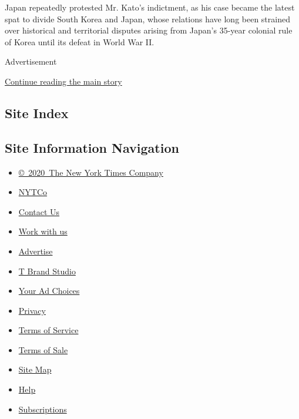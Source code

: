 Japan repeatedly protested Mr. Kato's indictment, as his case became the
latest spat to divide South Korea and Japan, whose relations have long
been strained over historical and territorial disputes arising from
Japan's 35-year colonial rule of Korea until its defeat in World War II.

Advertisement

\protect\hyperlink{after-bottom}{Continue reading the main story}

\hypertarget{site-index}{%
\subsection{Site Index}\label{site-index}}

\hypertarget{site-information-navigation}{%
\subsection{Site Information
Navigation}\label{site-information-navigation}}

\begin{itemize}
\tightlist
\item
  \href{https://help.nytimes.com/hc/en-us/articles/115014792127-Copyright-notice}{©~2020~The
  New York Times Company}
\end{itemize}

\begin{itemize}
\tightlist
\item
  \href{https://www.nytco.com/}{NYTCo}
\item
  \href{https://help.nytimes.com/hc/en-us/articles/115015385887-Contact-Us}{Contact
  Us}
\item
  \href{https://www.nytco.com/careers/}{Work with us}
\item
  \href{https://nytmediakit.com/}{Advertise}
\item
  \href{http://www.tbrandstudio.com/}{T Brand Studio}
\item
  \href{https://www.nytimes.com/privacy/cookie-policy\#how-do-i-manage-trackers}{Your
  Ad Choices}
\item
  \href{https://www.nytimes.com/privacy}{Privacy}
\item
  \href{https://help.nytimes.com/hc/en-us/articles/115014893428-Terms-of-service}{Terms
  of Service}
\item
  \href{https://help.nytimes.com/hc/en-us/articles/115014893968-Terms-of-sale}{Terms
  of Sale}
\item
  \href{https://spiderbites.nytimes.com}{Site Map}
\item
  \href{https://help.nytimes.com/hc/en-us}{Help}
\item
  \href{https://www.nytimes.com/subscription?campaignId=37WXW}{Subscriptions}
\end{itemize}
